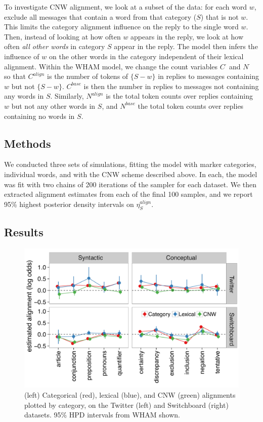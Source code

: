 \documentclass[11pt]{article}
\begin{document}
To investigate CNW alignment, we look at a subset of the data: for each word $w$, exclude all messages that contain a word from that category ($S$) that is not $w$. This limits the category alignment influence on the reply to the single word $w$. Then, instead of looking at how often $w$ appears in the reply, we look at how often \emph{all other words} in category $S$ appear in the reply.  The model then infers the influence of $w$ on the other words in the category independent of their lexical alignment. Within the WHAM model, we change the count variables $C^\cdot$ and $N^\cdot$ so that $C^{align}$ is the number of tokens of $\{S-w\}$ in replies to messages containing $w$ but not $\{S - w\}$. $C^{base}$ is then the number in replies to messages not containing any words in $S$.  Similarly, $N^{align}$ is the total token counts over replies containing $w$ but not any other words in $S$, and $N^{base}$ the total token counts over replies containing no words in $S$.

\subsection{Methods}

We conducted three sets of simulations, fitting the model with marker categories, individual words, and with the CNW scheme described above.
In each, the model was fit with two chains of 200 iterations of the sampler for each dataset.  We then extracted alignment estimates from each of the final 100 samples, and we report 95\% highest posterior density intervals on  $\eta^{align}_S$. %

\subsection{Results}


\begin{figure}[t]
  \begin{center}
    \includegraphics[width=1.5\columnwidth]{results/twitter_swbda_mod.pdf}
  \end{center}
  \caption{(left) Categorical (red), lexical (blue), and CNW (green) alignments plotted by category, on the Twitter (left) and Switchboard (right) datasets. 95\% HPD intervals from WHAM shown.}\label{fig:all-res}
\end{figure}
\end{document}
